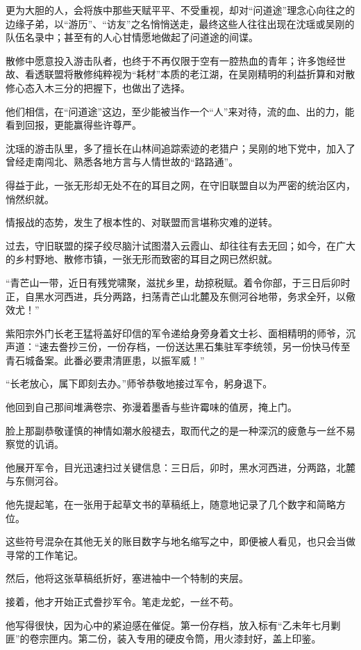 更为大胆的人，会将族中那些天赋平平、不受重视，却对“问道途”理念心向往之的边缘子弟，以“游历”、“访友”之名悄悄送走，最终这些人往往出现在沈瑶或吴刚的队伍名录中；甚至有的人心甘情愿地做起了问道途的间谍。

散修中愿意投入游击队者，也终于不再仅限于空有一腔热血的青年；许多饱经世故、看透联盟将散修纯粹视为“耗材”本质的老江湖，在吴刚精明的利益折算和对散修心态入木三分的把握下，也做出了选择。

他们相信，在“问道途”这边，至少能被当作一个“人”来对待，流的血、出的力，能看到回报，更能赢得些许尊严。

沈瑶的游击队里，多了擅长在山林间追踪索迹的老猎户；吴刚的地下党中，加入了曾经走南闯北、熟悉各地方言与人情世故的“路路通”。

得益于此，一张无形却无处不在的耳目之网，在守旧联盟自以为严密的统治区内，悄然织就。

\vspace{2em}

情报战的态势，发生了根本性的、对联盟而言堪称灾难的逆转。

过去，守旧联盟的探子绞尽脑汁试图潜入云霞山、却往往有去无回；如今，在广大的乡村野地、散修市镇，一张无形而致密的耳目之网已然织就。

“青芒山一带，近日有残党啸聚，滋扰乡里，劫掠税赋。着令你部，于三日后卯时正，自黑水河西进，兵分两路，扫荡青芒山北麓及东侧河谷地带，务求全歼，以儆效尤！”

紫阳宗外门长老王猛将盖好印信的军令递给身旁身着文士衫、面相精明的师爷，沉声道：“速去誊抄三份，一份存档，一份送达黑石集驻军李统领，另一份快马传至青石城备案。此番必要肃清匪患，以振军威！”

“长老放心，属下即刻去办。”师爷恭敬地接过军令，躬身退下。

他回到自己那间堆满卷宗、弥漫着墨香与些许霉味的值房，掩上门。

脸上那副恭敬谨慎的神情如潮水般褪去，取而代之的是一种深沉的疲惫与一丝不易察觉的讥诮。

他展开军令，目光迅速扫过关键信息：三日后，卯时，黑水河西进，分两路，北麓与东侧河谷。

他先提起笔，在一张用于起草文书的草稿纸上，随意地记录了几个数字和简略方位。

这些符号混杂在其他无关的账目数字与地名缩写之中，即便被人看见，也只会当做寻常的工作笔记。

然后，他将这张草稿纸折好，塞进袖中一个特制的夹层。

接着，他才开始正式誊抄军令。笔走龙蛇，一丝不苟。

他写得很快，因为心中的紧迫感在催促。第一份存档，放入标有“乙未年七月剿匪”的卷宗匣内。第二份，装入专用的硬皮令筒，用火漆封好，盖上印鉴。

